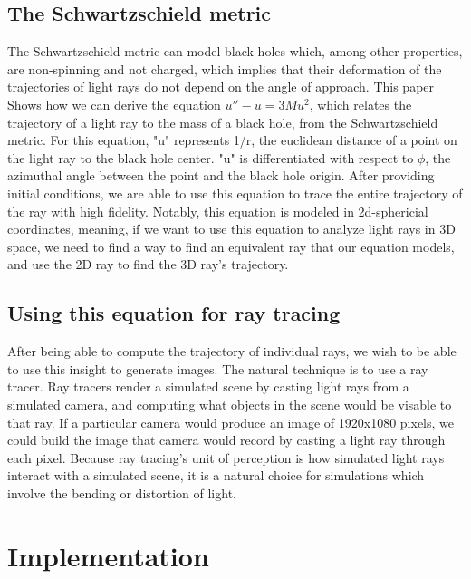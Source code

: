 \subsection{The Schwartzschield metric}

The Schwartzschield metric can model black holes which, among other properties, are non-spinning and not charged, which implies that their deformation of the trajectories of light rays do not depend on the angle of approach. This paper \cite {federov2019notes}  Shows how we can derive the equation $ u'' - u = 3Mu^2 $, which relates the trajectory of a light ray to the mass of a black hole, from the Schwartzschield metric. For this equation, "u" represents 1/r, the euclidean distance of a point on the light ray to the black hole center. "u" is differentiated with respect to $ \phi $, the azimuthal angle between the point and the black hole origin. After providing initial conditions, we are able to use this equation to trace the entire trajectory of the ray with high fidelity. Notably, this equation is modeled in 2d-sphericial coordinates, meaning, if we want to use this equation to analyze light rays in 3D space, we need to find a way to find an equivalent ray that our equation models, and use the 2D ray to find the 3D ray's trajectory.

\subsection {Using this equation for ray tracing}

After being able to compute the trajectory of individual rays, we wish to be able to use this insight to generate images. The natural technique is to use a ray tracer. Ray tracers render a simulated scene by casting light rays from a simulated camera, and computing what objects in the scene would be visable to that ray. If a particular camera would produce an image of 1920x1080 pixels, we could build the image that camera would record by casting a light ray through each pixel. Because ray tracing's unit of perception is how simulated light rays interact with a simulated scene, it is a natural choice for simulations which involve the bending or distortion of light.



\section{Implementation}
\label{sec:impl}


